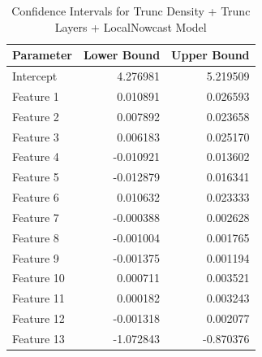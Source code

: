 \begin{table}
\caption{Confidence Intervals for Trunc Density + Trunc Layers + LocalNowcast Model}
\begin{tabular}{lrr}
\toprule
Parameter & Lower Bound & Upper Bound \\
\midrule
Intercept & 4.276981 & 5.219509 \\
Feature 1 & 0.010891 & 0.026593 \\
Feature 2 & 0.007892 & 0.023658 \\
Feature 3 & 0.006183 & 0.025170 \\
Feature 4 & -0.010921 & 0.013602 \\
Feature 5 & -0.012879 & 0.016341 \\
Feature 6 & 0.010632 & 0.023333 \\
Feature 7 & -0.000388 & 0.002628 \\
Feature 8 & -0.001004 & 0.001765 \\
Feature 9 & -0.001375 & 0.001194 \\
Feature 10 & 0.000711 & 0.003521 \\
Feature 11 & 0.000182 & 0.003243 \\
Feature 12 & -0.001318 & 0.002077 \\
Feature 13 & -1.072843 & -0.870376 \\
\bottomrule
\end{tabular}
\end{table}

